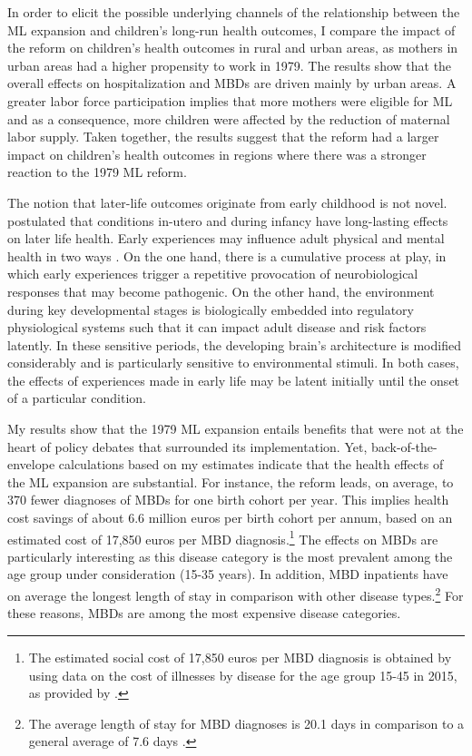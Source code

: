 In order to elicit the possible underlying channels of the relationship between the ML expansion and children's long-run health outcomes, I compare the impact of the reform on children's health outcomes in rural and urban areas, as mothers in urban areas had a higher propensity to work in 1979. The results show that the overall effects on hospitalization and MBDs are driven mainly by urban areas. A greater labor force participation implies that more mothers were eligible for ML and as a consequence, more children were affected by the reduction of maternal labor supply. Taken together, the results suggest that the reform had a larger impact on children's health outcomes in regions where there was a stronger reaction to the 1979 ML reform. 



The notion that later-life outcomes originate from early childhood is not novel. \cite{Barker1990origins} postulated that conditions in-utero and during infancy have long-lasting effects on later life health. Early experiences may influence adult physical and mental health in two ways \citep{shonkoff2009neuroscience}. On the one hand, there is a cumulative process at play, in which early experiences trigger a repetitive provocation of neurobiological responses that may become pathogenic. On the other hand, the environment during key developmental stages is biologically embedded into regulatory physiological systems such that it can impact adult disease and risk factors latently. In these sensitive periods, the developing brain's architecture is modified considerably and is particularly sensitive to environmental stimuli. In both cases, the effects of experiences made in early life may be latent initially until the onset of a particular condition.


My results show that the 1979 ML expansion entails benefits that were not at the heart of policy debates that surrounded its implementation. Yet, back-of-the-envelope calculations based on my estimates indicate that the health effects of the ML expansion are substantial. For instance, the reform leads, on average, to 370 fewer diagnoses of MBDs for one birth cohort per year. This implies health cost savings of about 6.6 million euros per birth cohort per annum, based on an estimated cost of 17,850 euros per MBD diagnosis.\footnote{The estimated social cost of 17,850 euros per MBD diagnosis is obtained by using data on the cost of illnesses by disease for the age group 15-45 in 2015, as provided by \cite{destatis2015}.} The effects on MBDs are particularly interesting as this disease category is the most prevalent among the age group under consideration (15-35 years). In addition, MBD inpatients have on average the longest length of stay in comparison with other disease types.\footnote{The average length of stay for MBD diagnoses is 20.1 days in comparison to a general average of 7.6 days \cite[p. 5]{statistisches2012diagnosedaten}.} For these reasons, MBDs are among the most expensive disease categories.


